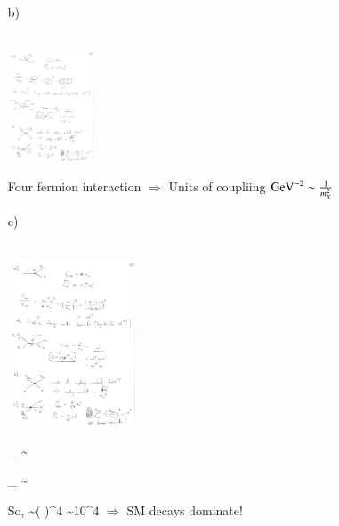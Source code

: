 {\begin{itemize}
\item[b)]{ ${ }$\\
\bc
\includegraphics[width=0.2\textwidth]{./eeDmDm.pdf}
\ec

Four fermion interaction $\Rightarrow$ Units of coupliing $\textrm{GeV}^{-2} \sim \frac{1}{m_X^2}$ 

}


\item[c)]{ ${ }$\\
\bc
\includegraphics[width=0.3\textwidth]{./muDecayX.pdf}
\ec

\be
\Gamma_{} \sim {} \hspace*{0.5in} 
\ee


\be
\Gamma_{} \sim {}  \hspace*{0.5in} 
\ee

So,
\be
{} \sim \left( \right)^4 \sim 10^4
\ee
$\Rightarrow$ SM decays dominate!
}

\end{itemize}




}

